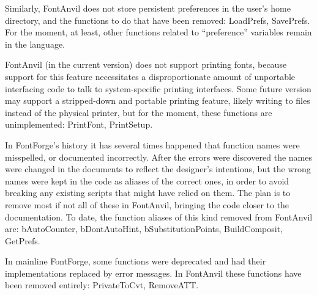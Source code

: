 Similarly, FontAnvil does not store persistent preferences in the user's
home directory, and the functions to do that have been removed: LoadPrefs,
SavePrefs.  For the moment, at least, other functions related to
``preference'' variables remain in the language.

FontAnvil (in the current version) does not support printing fonts, because
support for this feature necessitates a disproportionate amount of
unportable interfacing code to talk to system-specific printing interfaces. 
Some future version may support a stripped-down and portable printing
feature, likely writing to files instead of the physical printer, but for
the moment, these functions are unimplemented:  PrintFont, PrintSetup.

In FontForge's history it has several times happened that function names
were misspelled, or documented incorrectly.  After the errors were
discovered the names were changed in the documents to reflect the designer's
intentions, but the wrong names were kept in the code as aliases of the
correct ones, in order to avoid breaking any existing scripts that might
have relied on them.  The plan is to remove most if not all of these in
FontAnvil, bringing the code closer to the documentation.  To date, the
function aliases of this kind removed from FontAnvil are: bAutoCounter,
bDontAutoHint, bSubstitutionPoints, BuildComposit, GetPrefs.

In mainline FontForge, some functions were deprecated and had their
implementations replaced by error messages.  In FontAnvil these functions
have been removed entirely:  PrivateToCvt, RemoveATT.
